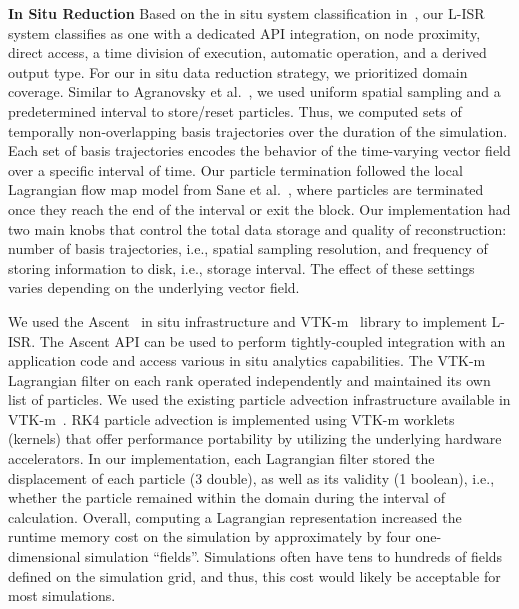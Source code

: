 \noindent\textbf{In Situ Reduction}
%
Based on the in situ system classification in~\cite{childs2020terminology}, our L-ISR system classifies as one with a dedicated API integration, on node proximity, direct access, a time division of execution, automatic operation, and a derived output type.
%
For our in situ data reduction strategy, we prioritized domain coverage.
%
Similar to Agranovsky et al.~\cite{agranovsky2014improved}, we used uniform spatial sampling and a predetermined interval to store/reset particles.
%
Thus, we computed sets of temporally non-overlapping basis trajectories over the duration of the simulation.
%
%
Each set of basis trajectories encodes the behavior of the time-varying vector field over a specific interval of time.
%
%
%
Our particle termination followed the local Lagrangian flow map model from Sane et al.~\cite{sane2020scalable}, where particles are terminated once they reach the end of the interval or exit the block.
%
Our implementation had two main knobs that control the total data storage and quality of reconstruction: number of basis trajectories, i.e., spatial sampling resolution, and frequency of storing information to disk, i.e., storage interval.
%
The effect of these settings varies depending on the underlying vector field. 
%

We used the Ascent~\cite{Larsen2017Alpine} in situ infrastructure and VTK-m~\cite{moreland2016vtk} library to implement L-ISR. 
%
The Ascent API can be used to perform tightly-coupled integration with an application code and access various in situ analytics capabilities.
The VTK-m Lagrangian filter on each rank operated independently and maintained its own list of particles.
%
We used the existing particle advection infrastructure available in VTK-m~\cite{pugmire2018performance}.
%
RK4 particle advection is implemented using VTK-m worklets (kernels) that offer performance portability by utilizing the underlying hardware accelerators.
%
In our implementation, each Lagrangian filter stored the displacement of each particle (3 double), as well as its validity (1 boolean), i.e., whether the particle remained within the domain during the interval of calculation.
%
Overall, computing a Lagrangian representation increased the runtime memory cost on the simulation by approximately by four one-dimensional simulation ``fields''.
%
Simulations often have tens to hundreds of fields defined on the simulation grid, and thus, this cost would likely be acceptable for most simulations.
%
%

